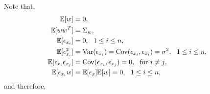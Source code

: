 Note that,
\begin{equation*}
  \begin{aligned}
    \mathbb{E}[w] &= 0, \\
    \mathbb{E}[ww^T] &= \Sigma_w, \\
    \mathbb{E}[\epsilon_{x_i}] &= 0, \ \ 1 \leq i \leq n, \\
    \mathbb{E}[\epsilon_{x_i}^2] &= \textup{Var}(\epsilon_{x_i}) = \textup{Cov}(\epsilon_{x_i},\epsilon_{x_i}) =  \sigma^2, \ \ 1 \leq i \leq n, \\
    \mathbb{E}[\epsilon_{x_i} \epsilon_{x_j}] &= \textup{Cov}(\epsilon_{x_i},\epsilon_{x_j}) = 0, \ \ \text{for $i \neq j$}, \\%
    \mathbb{E}[\epsilon_{x_i}w] &= \mathbb{E}[\epsilon_x]\mathbb{E}[w] = 0, \ \ 1 \leq i \leq n, \\%
  \end{aligned}
\end{equation*}
and therefore,
